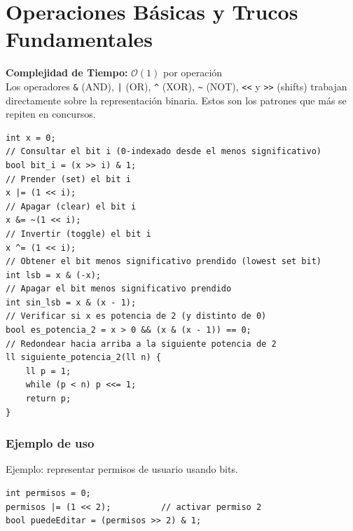 \documentclass[10pt,twocolumn,letterpaper]{report}
\begin{document}
\section{Operaciones Básicas y Trucos Fundamentales}
\textbf{Complejidad de Tiempo:} $\mathcal{O}(1)$ por operación \\
Los operadores \texttt{\&} (AND), \texttt{|} (OR), \texttt{\^} (XOR), \texttt{\textasciitilde} (NOT), \texttt{<<} y \texttt{>>} (shifts) trabajan directamente sobre la representación binaria. Estos son los patrones que más se repiten en concursos.
\begin{lstlisting}
int x = 0;
// Consultar el bit i (0-indexado desde el menos significativo)
bool bit_i = (x >> i) & 1;
// Prender (set) el bit i
x |= (1 << i);
// Apagar (clear) el bit i
x &= ~(1 << i);
// Invertir (toggle) el bit i
x ^= (1 << i);
// Obtener el bit menos significativo prendido (lowest set bit)
int lsb = x & (-x);
// Apagar el bit menos significativo prendido
int sin_lsb = x & (x - 1);
// Verificar si x es potencia de 2 (y distinto de 0)
bool es_potencia_2 = x > 0 && (x & (x - 1)) == 0;
// Redondear hacia arriba a la siguiente potencia de 2
ll siguiente_potencia_2(ll n) {
    ll p = 1;
    while (p < n) p <<= 1;
    return p;
}
\end{lstlisting}
\subsubsection*{Ejemplo de uso}
Ejemplo: representar permisos de usuario usando bits.
\begin{lstlisting}
int permisos = 0;
permisos |= (1 << 2);          // activar permiso 2
bool puedeEditar = (permisos >> 2) & 1;
\end{lstlisting}
\end{document}
